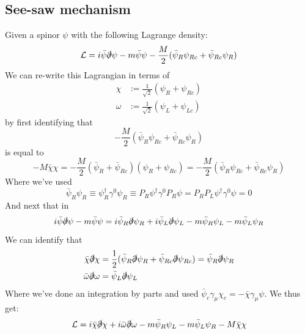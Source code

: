 \documentclass[11pt,a4paper,faculty=we,language=en,doctype=report]{cls/ugent-doc}
\begin{document}
\subsection{See-saw mechanism}
Given a spinor $\psi$ with the following Lagrange density:
\begin{equation}
	\mathcal{L} = i\bar{\psi}\slashed{\partial}\psi - m\bar{\psi}\psi - \frac{M}{2} (\bar{\psi}_R\psi_{Rc} + \bar{\psi}_{Rc}\psi_R)
\end{equation}
We can re-write this Lagrangian in terms of
\begin{align}
	\chi &:= \frac{1}{\sqrt{2}} (\psi_R + \psi_{Rc})\\
	\omega &:= \frac{1}{\sqrt{2}} (\psi_L + \psi_{Lc})
\end{align}
by first identifying that
\begin{equation}
	- \frac{M}{2} (\bar{\psi}_R\psi_{Rc} + \bar{\psi}_{Rc}\psi_R)
\end{equation}
is equal to
\begin{equation}
	-M\bar{\chi} \chi = -\frac{M}{2} (\bar{\psi}_R + \bar{\psi}_{Rc}) (\psi_R + \psi_{Rc}) = -\frac{M}{2} (\bar{\psi}_R\psi_{Rc} + \bar{\psi}_{Rc}\psi_R)
\end{equation}
Where we've used
\begin{equation}
	\bar{\psi}_R\psi_{R} \equiv \psi_R^\dagger\gamma^0\psi_{R} \equiv P_R\psi^\dagger\gamma^0P_R\psi = P_RP_L\psi^\dagger\gamma^0\psi = 0
\end{equation}
And next that in
\begin{equation}
	i\bar{\psi}\slashed{\partial}\psi - m\bar{\psi}\psi = i\bar{\psi}_R\slashed{\partial}\psi_{R} + i\bar{\psi}_L\slashed{\partial}\psi_{L} - m\bar{\psi}_R\psi_{L} - m\bar{\psi}_L\psi_{R}
\end{equation}
We can identify that
\begin{align}
	\bar{\chi}\slashed{\partial}\chi &= \frac{1}{2}(\bar{\psi}_R\slashed{\partial}\psi_{R} + \bar{\psi}_{Rc}\slashed{\partial}\psi_{Rc}) = \bar{\psi}_R \slashed{\partial} \psi_{R}\\
	\bar{\omega}\slashed{\partial}\omega &= \bar{\psi}_L \slashed{\partial} \psi_{L}
\end{align}
Where we've done an integration by parts and used $\bar{\psi}_c\gamma_\mu\chi_c = -\bar{\chi}\gamma_\mu\psi$. We thus get:
\begin{equation}
	\mathcal{L} = i\bar{\chi}\slashed{\partial}\chi +i\bar{\omega}\slashed{\partial}\omega - m\bar{\psi}_R\psi_{L} - m\bar{\psi}_L\psi_{R} -M\bar{\chi} \chi 
\end{equation}
\end{document}

